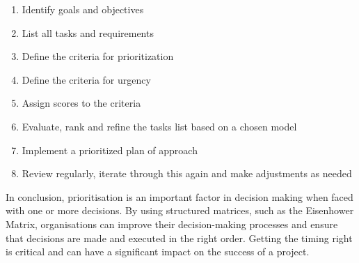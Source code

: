 \begin{enumerate}
    \item Identify goals and objectives
    \item List all tasks and requirements 
    \item Define the criteria for prioritization 
    \item Define the criteria for urgency 
    \item Assign scores to the criteria 
    \item Evaluate, rank and refine the tasks list based on a chosen model 
    \item Implement a prioritized plan of approach
    \item Review regularly, iterate through this again and make adjustments as needed
\end{enumerate}

\noindent In conclusion, prioritisation is an important factor in decision making when faced with one or more decisions. By using structured matrices, such as the Eisenhower Matrix, organisations can improve their decision-making processes and ensure that decisions are made and executed in the right order. Getting the timing right is critical and can have a significant impact on the success of a project. \cite{prioritization_mayan_2024}

